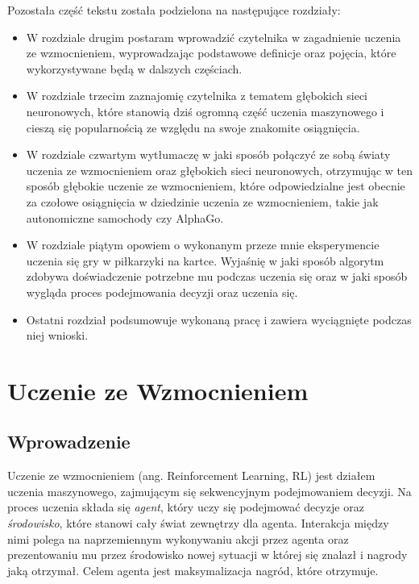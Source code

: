 \documentclass[licencjacka]{pracamgr}
\begin{document}
Pozostała część tekstu została podzielona na następujące rozdziały:
\begin{itemize}

\item W rozdziale drugim postaram wprowadzić czytelnika w zagadnienie uczenia ze wzmocnieniem, wyprowadzając podstawowe definicje oraz pojęcia, które wykorzystywane będą w dalszych częściach.

\item W rozdziale trzecim zaznajomię czytelnika z tematem głębokich sieci neuronowych, które stanowią dziś ogromną część uczenia maszynowego i cieszą się popularnością ze względu na swoje znakomite osiągnięcia.

\item W rozdziale czwartym wytłumaczę w jaki sposób połączyć ze sobą światy uczenia ze wzmocnieniem oraz głębokich sieci neuronowych, otrzymując w ten sposób głębokie uczenie ze wzmocnieniem, które odpowiedzialne jest obecnie za czołowe osiągnięcia w dziedzinie uczenia ze wzmocnieniem, takie jak autonomiczne samochody czy AlphaGo.

\item W rozdziale piątym opowiem o wykonanym przeze mnie eksperymencie uczenia się gry w piłkarzyki na kartce. Wyjaśnię w jaki sposób algorytm zdobywa doświadczenie potrzebne mu podczas uczenia się oraz w jaki sposób wygląda proces podejmowania decyzji oraz uczenia się.

\item Ostatni rozdział podsumowuje wykonaną pracę i zawiera wyciągnięte podczas niej wnioski.
\end{itemize}
 
\chapter{Uczenie ze Wzmocnieniem}\label{r:rl}

\section{Wprowadzenie}

Uczenie ze wzmocnieniem (ang. Reinforcement Learning, RL) \cite{Sutton, Szepesvari} jest działem uczenia maszynowego, zajmującym się sekwencyjnym podejmowaniem decyzji. Na proces uczenia składa się \emph{agent}, który uczy się podejmować decyzje oraz \emph{środowisko}, które stanowi cały świat zewnętrzy dla agenta. Interakcja między nimi polega na naprzemiennym wykonywaniu akcji przez agenta oraz prezentowaniu mu przez środowisko nowej sytuacji w której się znalazł i nagrody jaką otrzymał. Celem agenta jest maksymalizacja nagród, które otrzymuje.
\end{document}
